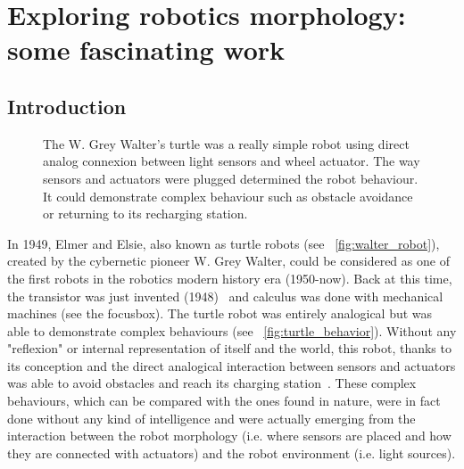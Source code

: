 
\cleartoleftpage


\chapter{Exploring robotics morphology: some fascinating work} %
\label{cha:morphology-review}


\section{Introduction} %

\begin{figure}[!b]
\centering
    \hfil
    \caption{The W. Grey Walter's turtle was a really simple robot using direct analog connexion between light sensors and wheel actuator. The way sensors and actuators were plugged determined the robot behaviour. It could demonstrate complex behaviour such as obstacle avoidance or returning to its recharging station.}
    \label{fig:turtle_robot}
\end{figure}


In 1949, Elmer and Elsie, also known as turtle robots (see \figurename~\ref{fig:walter_robot}), created by the cybernetic pioneer W. Grey Walter, could be considered as one of the first robots in the robotics modern history era (1950-now). Back at this time, the transistor was just invented (1948)~\cite{brinkman1997history} and calculus was done with mechanical machines (see the focusbox). The turtle robot was entirely analogical but was able to demonstrate complex behaviours (see \figurename~\ref{fig:turtle_behavior}). Without any "reflexion" or internal representation of itself and the world, this robot, thanks to its conception and the direct analogical interaction between sensors and actuators was able to avoid obstacles and reach its charging station~\cite{walter1950imitation}.
These complex behaviours, which can be compared with the ones found in nature, were in fact done without any kind of intelligence and were actually emerging from the interaction between the robot morphology (i.e. where sensors are placed and how they are connected with actuators) and the robot environment (i.e. light sources).


